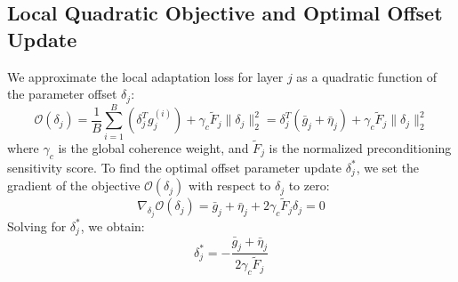 \documentclass{article}
\theoremstyle{plain}
\theoremstyle{definition}
\theoremstyle{remark}
\begin{document}
\subsection{Local Quadratic Objective and Optimal Offset Update}
We approximate the local adaptation loss for layer $j$ as a quadratic function of the parameter offset $\delta_j$:
\begin{equation}
    \mathcal{O}(\delta_j) = \frac{1}{B} \sum_{i=1}^B \left( \delta_j^T g_j^{(i)} \right) + \gamma_c \tilde{F}_j \|\delta_j\|_2^2 = \delta_j^T (\bar{g}_j + \bar{\eta}_j) + \gamma_c \tilde{F}_j \|\delta_j\|_2^2
\end{equation}
where $\gamma_c$ is the global coherence weight, and $\tilde{F}_j$ is the normalized preconditioning sensitivity score. To find the optimal offset parameter update $\delta_j^*$, we set the gradient of the objective $\mathcal{O}(\delta_j)$ with respect to $\delta_j$ to zero:
\begin{equation}
    \nabla_{\delta_j} \mathcal{O}(\delta_j) = \bar{g}_j + \bar{\eta}_j + 2 \gamma_c \tilde{F}_j \delta_j = 0
\end{equation}
Solving for $\delta_j^*$, we obtain:
\begin{equation}
    \delta_j^* = -\frac{\bar{g}_j + \bar{\eta}_j}{2 \gamma_c \tilde{F}_j}
\end{equation}
\end{document}
